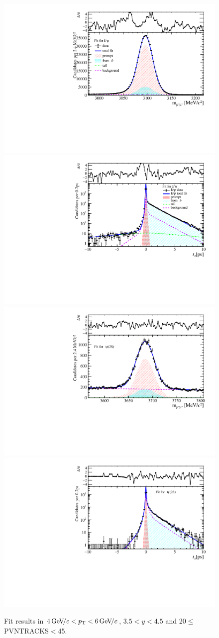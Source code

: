 \begin{figure}[H]
\begin{center}
\includegraphics[width=0.47\linewidth]{pdf/Jpsi/drawmass/n2y3pt3.pdf}
\includegraphics[width=0.47\linewidth]{pdf/Jpsi/2DFit/n2y3pt3.pdf}
\vspace*{-0.5cm}
\includegraphics[width=0.47\linewidth]{pdf/Psi2S/drawmass/n2y3pt3.pdf}
\includegraphics[width=0.47\linewidth]{pdf/Psi2S/2DFit/n2y3pt3.pdf}
\vspace*{-0.5cm}
\end{center}
\caption{Fit results in $4\text{\,Ge\kern -0.1em V\!/}c<p_{\mathrm{T}}<6\text{\,Ge\kern -0.1em V\!/}c$, $3.5<y<4.5$ and 20$\leq$PVNTRACKS$<$45.}
\label{Fitn2y3pt3}
\end{figure}
